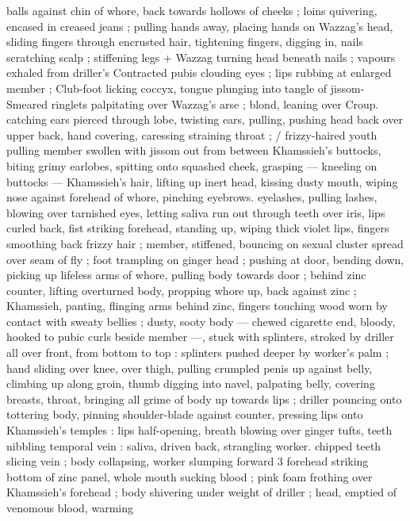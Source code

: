 balls against chin of whore, back towards hollows of cheeks ; loins 
quivering, encased in creased jeans ; pulling hands away, placing 
hands on Wazzag's head, sliding fingers through encrusted hair, 
tightening fingers, digging in, nails scratching scalp ; stiffening legs 
+ Wazzag turning head beneath nails ; vapours exhaled from driller's 
Contracted pubis clouding eyes ; lips rubbing at enlarged member ; 
Club-foot licking coccyx, tongue plunging into tangle of jissom- 
Smeared ringlets palpitating over Wazzag's arse ; blond, leaning over 
Croup. catching ears pierced through lobe, twisting ears, pulling, 
pushing head back over upper back, hand covering, caressing 
straining throat ; {\slash} frizzy-haired youth pulling member swollen with 
jissom out from between Khamssieh's buttocks, biting grimy 
earlobes, spitting onto squashed cheek, grasping --- kneeling on 
buttocks --- Khamssieh's hair, lifting up inert head, kissing dusty 
mouth, wiping nose against forehead of whore, pinching eyebrows. 
eyelashes, pulling lashes, blowing over tarnished eyes, letting saliva 
run out through teeth over iris, lips curled back, fist striking 
forehead, standing up, wiping thick violet lips, fingers smoothing 
back frizzy hair ; member, stiffened, bouncing on sexual cluster 
spread over seam of fly ; foot trampling on ginger head ; pushing at 
door, bending down, picking up lifeless arms of whore, pulling body 
towards door ; behind zinc counter, lifting overturned body, propping 
whore up, back against zinc ; Khamssieh, panting, flinging arms 
behind zinc, fingers touching wood worn by contact with sweaty 
bellies ; dusty, sooty body --- chewed cigarette end, bloody, hooked 
to pubic curls beside member ---, stuck with splinters, stroked by 
driller all over front, from bottom to top : splinters pushed deeper by 
worker's palm ; hand sliding over knee, over thigh, pulling crumpled 
penis up against belly, climbing up along groin, thumb digging into 
navel, palpating belly, covering breasts, throat, bringing all grime of 
body up towards lips ; driller pouncing onto tottering body, pinning 
shoulder-blade against counter, pressing lips onto Khamssieh's 
temples : lips half-opening, breath blowing over ginger tufts, teeth 
nibbling temporal vein : saliva, driven back, strangling worker. 
chipped teeth slicing vein ; body collapsing, worker slumping forward 
3 forehead striking bottom of zinc panel, whole mouth sucking blood 
; pink foam frothing over Khamssieh's forehead ; body shivering 
under weight of driller ; head, emptied of venomous blood, warming 
